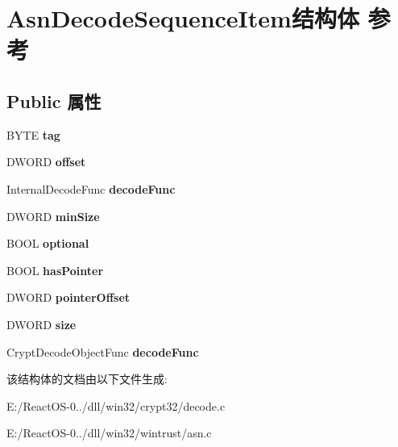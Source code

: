 \hypertarget{struct_asn_decode_sequence_item}{}\section{Asn\+Decode\+Sequence\+Item结构体 参考}
\label{struct_asn_decode_sequence_item}
\subsection*{Public 属性}
\begin{DoxyCompactItemize}
\item 
\mbox{\label{struct_asn_decode_sequence_item_a63bd0f91e88f1847a537fbf0799fe076}} 
B\+Y\+TE {\bfseries tag}
\item 
\mbox{\label{struct_asn_decode_sequence_item_a6ce65752264410090cafee27b626e463}} 
D\+W\+O\+RD {\bfseries offset}
\item 
\mbox{\label{struct_asn_decode_sequence_item_a7bebbe319a9f18a5861ebe4b76cce1a1}} 
Internal\+Decode\+Func {\bfseries decode\+Func}
\item 
\mbox{\label{struct_asn_decode_sequence_item_a094d91e7017375f7a38d54ded7d894bc}} 
D\+W\+O\+RD {\bfseries min\+Size}
\item 
\mbox{\label{struct_asn_decode_sequence_item_ae12902dbc2746f92195282391cb44ede}} 
B\+O\+OL {\bfseries optional}
\item 
\mbox{\label{struct_asn_decode_sequence_item_a16767d3ffe4adf8ad46656447b56c639}} 
B\+O\+OL {\bfseries has\+Pointer}
\item 
\mbox{\label{struct_asn_decode_sequence_item_ac0280733eaadc48eae7c9ab83a3a6fde}} 
D\+W\+O\+RD {\bfseries pointer\+Offset}
\item 
\mbox{\label{struct_asn_decode_sequence_item_a91f22c28b5a1faa1a2bc49d512e6e81c}} 
D\+W\+O\+RD {\bfseries size}
\item 
\mbox{\label{struct_asn_decode_sequence_item_a12c92608a6228fd43949f8c18cb02525}} 
Crypt\+Decode\+Object\+Func {\bfseries decode\+Func}
\end{DoxyCompactItemize}


该结构体的文档由以下文件生成\+:\begin{DoxyCompactItemize}
\item 
E\+:/\+React\+O\+S-\/0../dll/win32/crypt32/decode.\+c\item 
E\+:/\+React\+O\+S-\/0../dll/win32/wintrust/asn.\+c\end{DoxyCompactItemize}

